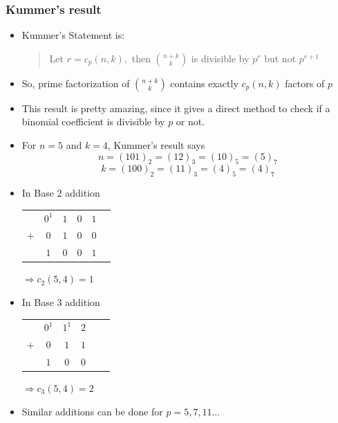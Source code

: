 \documentclass{beamer}
\begin{document}
\begin{frame}
    \frametitle{Kummer's result}
    \begin{itemize}
        \item Kummer's Statement is:
        \begin{quote}
            Let $r = c_p(n,k),$ then $\binom{n+k}{k}$ is divisible by $p^r$ but not $p^{r + 1}$
        \end{quote}
        \item So, prime factorization of $\binom{n+k}{k}$ contains exactly $c_p(n,k)$ factors of $p$
        \item This result is pretty amazing, since it gives a direct method to check if a binomial coefficient is divisible by $p$ or not.
    \end{itemize}
\end{frame}

\begin{frame}
    \begin{itemize}
        \item For $n=5$ and $k=4$, Kummer's result says
        \begin{equation*}
            n = (101)_2 = (12)_3 = (10)_5 = (5)_7
        \end{equation*}
        \begin{equation*}
            k = (100)_2 = (11)_3 = (4)_5 = (4)_7
        \end{equation*}
        \item In Base 2 addition
        \begin{tabular}{cccccc}
            & $0^1$ & $1$ & $0$ & $1$ \\
            + & $0$ & $1$ & $0$ & $0$ \\
            \hline
            & $1$ & $0$ & $0$ & $1$  
        \end{tabular}
        $\Rightarrow c_2(5,4) = 1$ 
        \item In Base 3 addition 
        \begin{tabular}{cccccc}
            & $0^1$ & $1^1$ & $2$\\
            + & $0$ & $1$ & $1$\\
            \hline
            & $1$ & $0$ & $0$   
        \end{tabular}
        $\Rightarrow c_3(5,4) = 2$
        \item Similar additions can be done for $p = 5,7,11\dots$
    \end{itemize}
\end{frame}
\end{document}
